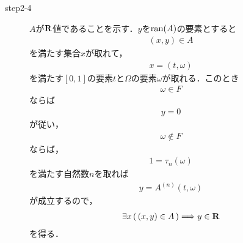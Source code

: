 \begin{sketch}
\begin{description}
			\item[step2-4]
				$A$が$\mathbf{R}$値であることを示す．$y$を$\operatorname*{ran} (A)$の要素とすると
				\begin{align}
					(x,y) \in A
				\end{align}
				を満たす集合$x$が取れて，
				\begin{align}
					x = (t,\omega)
				\end{align}
				を満たす$[0,1]$の要素$t$と$\Omega$の要素$\omega$が取れる．このとき
				\begin{align}
					\omega \in F
				\end{align}
				ならば
				\begin{align}
					y = 0
				\end{align}
				が従い，
				\begin{align}
					\omega \notin F
				\end{align}
				ならば，
				\begin{align}
					1 = \tau_{n}(\omega)
				\end{align}
				を満たす自然数$n$を取れば
				\begin{align}
					y = A^{(n)}(t,\omega)
				\end{align}
				が成立するので，
				\begin{align}
					\exists x\, (\, (x,y) \in A\, ) \Longrightarrow y \in \mathbf{R}
				\end{align}
				を得る．
				\QED
		\end{description}
	\end{sketch}
	